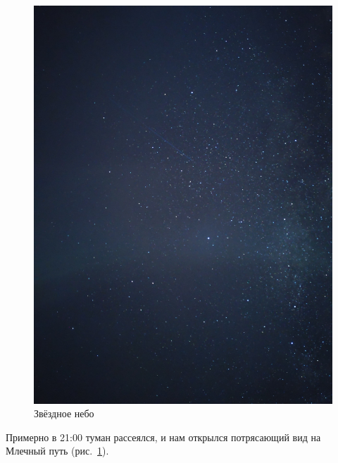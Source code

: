 \begin{figure}[h]	
	\centering
	\includegraphics[angle=0, width=0.7\linewidth]{../pics/IMG_20240823_205116}
	\caption{Звёздное небо}
	\label{fig:IMG_20240823_205116}
\end{figure}
 
 Примерно в 21:00 туман рассеялся, и нам открылся потрясающий вид на Млечный путь (рис.~\ref{fig:IMG_20240823_205116}).
 
\newpage
